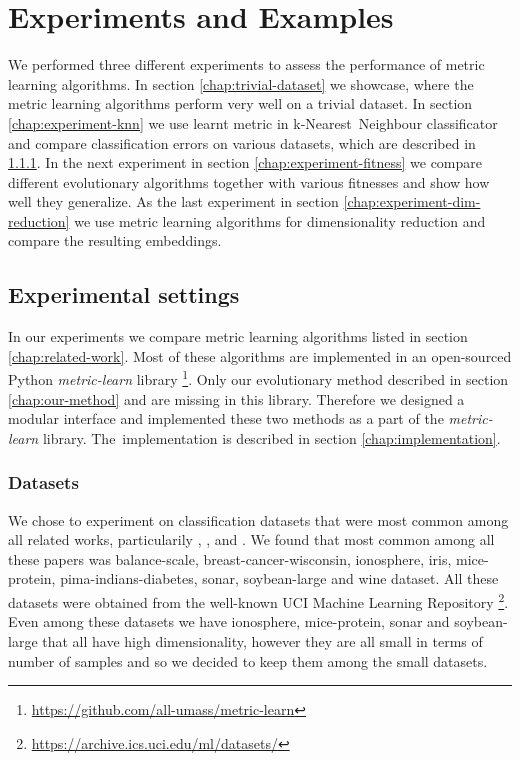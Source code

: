 \documentclass[12pt,a4paper]{report}
\begin{document}
\chapter{Experiments and Examples}
We performed three different experiments to assess the performance of metric learning algorithms. In section \ref{chap:trivial-dataset} we showcase, where the metric learning algorithms perform very well on a trivial dataset. In section \ref{chap:experiment-knn} we use learnt metric in k-Nearest~Neighbour classificator and compare classification errors on various datasets, which are described in \ref{chap:datasets}. In the next experiment in section \ref{chap:experiment-fitness} we compare different evolutionary algorithms together with various fitnesses and show how well they generalize. As the last experiment in section \ref{chap:experiment-dim-reduction} we use metric learning algorithms for dimensionality reduction and compare the resulting embeddings.

\section{Experimental settings} 
In our experiments we compare metric learning algorithms listed in section \ref{chap:related-work}. Most of these algorithms are implemented in an open-sourced Python \textit{metric-learn} library \footnote{\url{https://github.com/all-umass/metric-learn}}. Only our evolutionary method described in section \ref{chap:our-method} and \cite{fukui2013evolutionary} are missing in this library. Therefore we designed a modular interface and implemented these two methods as a part of the \textit{metric-learn} library. The~implementation is described in section \ref{chap:implementation}.

\subsection{Datasets} \label{chap:datasets}
We chose to experiment on classification datasets that were most common among all related works, particularily \cite{xing2002distance}, \cite{weinberger2009distance}, \cite{jacobgoldberger2004neighbourhood} and \cite{fukui2013evolutionary}. We found that most common among all these papers was balance-scale, breast-cancer-wisconsin, ionosphere, iris, mice-protein, pima-indians-diabetes, sonar, soybean-large and wine dataset. All these datasets were obtained from the well-known UCI Machine Learning Repository \footnote{\url{https://archive.ics.uci.edu/ml/datasets/}}. Even among these datasets we have ionosphere, mice-protein, sonar and soybean-large that all have high dimensionality, however they are all small in terms of number of samples and so we decided to keep them among the small datasets.
\end{document}
